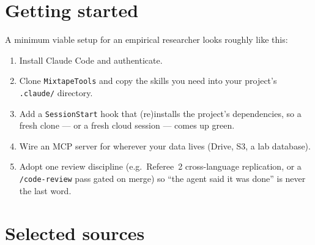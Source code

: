 \documentclass[11pt,a4paper]{article}
\begin{document}
\section{Getting started}

A minimum viable setup for an empirical researcher looks roughly
like this:

\begin{enumerate}[leftmargin=1.4em]
  \item Install Claude Code and authenticate.
  \item Clone \texttt{MixtapeTools} and copy the skills you need
        into your project's \texttt{.claude/} directory.
  \item Add a \texttt{SessionStart} hook that (re)installs the
        project's dependencies, so a fresh clone --- or a fresh
        cloud session --- comes up green.
  \item Wire an MCP server for wherever your data lives (Drive,
        S3, a lab database).
  \item Adopt one review discipline (e.g.\ Referee~2 cross-language
        replication, or a \texttt{/code-review} pass gated on
        merge) so ``the agent said it was done'' is never the last
        word.
\end{enumerate}

\section{Selected sources}
\end{document}
